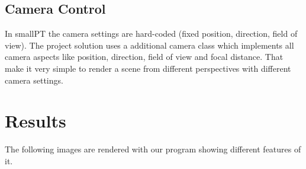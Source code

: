 \documentclass[11pt,a4paper]{article}
\begin{document}
\subsection{Camera Control}
In smallPT the camera settings are hard-coded (fixed position, direction, field of view). The project solution uses a additional camera class which implements all camera aspects like position, direction, field of view and focal distance. That make it very simple to render a scene from different perspectives with different camera settings.

\section{Results}
The following images are rendered with our program showing different features of it.
\end{document}
